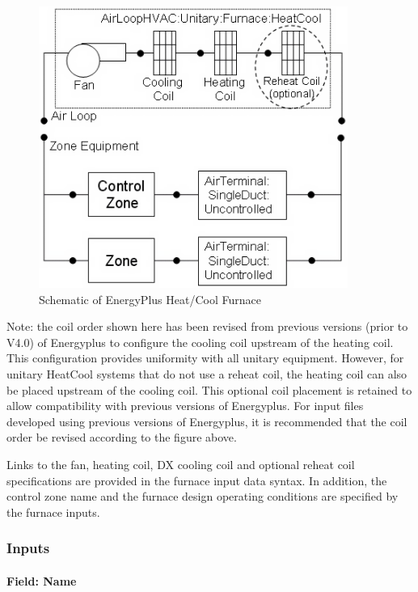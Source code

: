 \begin{figure}[hbtp] %
\centering
\includegraphics[width=0.9\textwidth, height=0.9\textheight, keepaspectratio=true]{media/image298.png}
\caption{Schematic of EnergyPlus Heat/Cool Furnace \protect \label{fig:schematic-of-energyplus-heatcool-furnace}}
\end{figure}

Note: the coil order shown here has been revised from previous versions (prior to V4.0) of Energyplus to configure the cooling coil upstream of the heating coil. This configuration provides uniformity with all unitary equipment. However, for unitary HeatCool systems that do not use a reheat coil, the heating coil can also be placed upstream of the cooling coil. This optional coil placement is retained to allow compatibility with previous versions of Energyplus. For input files developed using previous versions of Energyplus, it is recommended that the coil order be revised according to the figure above.

Links to the fan, heating coil, DX cooling coil and optional reheat coil specifications are provided in the furnace input data syntax. In addition, the control zone name and the furnace design operating conditions are specified by the furnace inputs.

\subsubsection{Inputs}\label{inputs-2-043}

\paragraph{Field: Name}\label{field-name-2-040}

